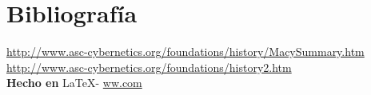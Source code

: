 \documentclass{article}
\begin{document}
\vspace{1cm}

\section*{Bibliograf\'ia}

\noindent \url{http://www.asc-cybernetics.org/foundations/history/MacySummary.htm}
\\
\noindent \url{http://www.asc-cybernetics.org/foundations/history2.htm}
\\

\large{\hfill \textbf{Hecho en } \LaTeX - \url{ww.com}}
\end{document}

